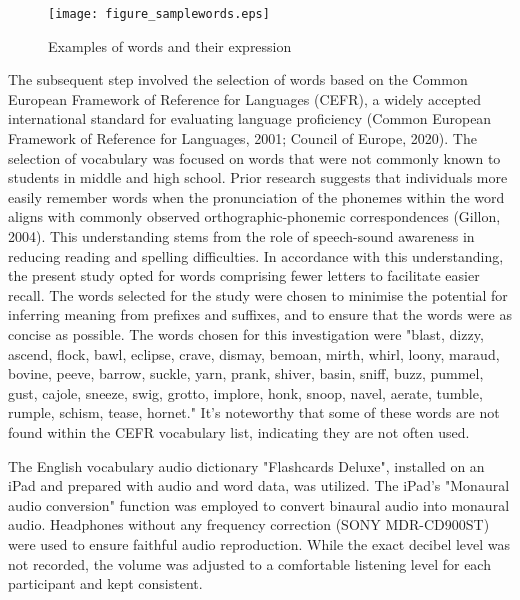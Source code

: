 \documentclass{ehissymp}
\begin{document}
\begin{figure}[H]
   \centering
   \texttt{[image: figure\_samplewords.eps]}
   \caption{Examples of words and their expression}
\end{figure}


The subsequent step involved the selection of words based on the Common European Framework of Reference for Languages (CEFR), a widely accepted international standard for evaluating language proficiency (Common European Framework of Reference for Languages, 2001; Council of Europe, 2020). The selection of vocabulary was focused on words that were not commonly known to students in middle and high school. Prior research suggests that individuals more easily remember words when the pronunciation of the phonemes within the word aligns with commonly observed orthographic-phonemic correspondences (Gillon, 2004). This understanding stems from the role of speech-sound awareness in reducing reading and spelling difficulties. In accordance with this understanding, the present study opted for words comprising fewer letters to facilitate easier recall. The words selected for the study were chosen to minimise the potential for inferring meaning from prefixes and suffixes, and to ensure that the words were as concise as possible. The words chosen for this investigation were "blast, dizzy, ascend, flock, bawl, eclipse, crave, dismay, bemoan, mirth, whirl, loony, maraud, bovine, peeve, barrow, suckle, yarn, prank, shiver, basin, sniff, buzz, pummel, gust, cajole, sneeze, swig, grotto, implore, honk, snoop, navel, aerate, tumble, rumple, schism, tease, hornet." It's noteworthy that some of these words are not found within the CEFR vocabulary list, indicating they are not often used.

The English vocabulary audio dictionary "Flashcards Deluxe", installed on an iPad and prepared with audio and word data, was utilized. The iPad's "Monaural audio conversion" function was employed to convert binaural audio into monaural audio. Headphones without any frequency correction (SONY MDR-CD900ST) were used to ensure faithful audio reproduction. While the exact decibel level was not recorded, the volume was adjusted to a comfortable listening level for each participant and kept consistent. 
\end{document}
